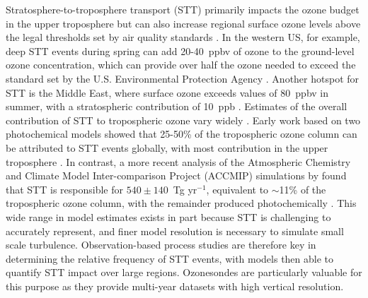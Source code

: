   Stratosphere-to-troposphere transport (STT) primarily impacts the ozone budget in the upper troposphere but can also increase regional surface ozone levels above the legal thresholds set by air quality standards \parencite{Danielson1968, Lelieveld2009, Lefohn2011, Langford2012, Zhang2014, Lin2015}.
  In the western US, for example, deep STT events during spring can add 20-40~ppbv of ozone to the ground-level ozone concentration, which can provide over half the ozone needed to exceed the standard set by the U.S. Environmental Protection Agency \parencite{Lin2012, Lin2015}.
  Another hotspot for STT is the Middle East, where surface ozone exceeds values of 80~ppbv in summer, with a stratospheric contribution of 10~ppb \parencite{Lelieveld2009}.
  Estimates of the overall contribution of STT to tropospheric ozone vary widely \parencite[e.g.][]{Galani2003, Stohl2003, Stevenson2006, Lefohn2011}.
  Early work based on two photochemical models showed that 25-50\% of the tropospheric ozone column can be attributed to STT events globally, with most contribution in the upper troposphere \parencite{Stohl2003}.
  In contrast, a more recent analysis of the Atmospheric Chemistry and Climate Model Inter-comparison Project (ACCMIP) simulations by \textcite{Young2013} found that STT is responsible for $540\pm140$~Tg yr$^{-1}$, equivalent to $\sim$11\% of the tropospheric ozone column, with the remainder produced photochemically \parencite{Monks2015}.
  This wide range in model estimates exists in part because STT is challenging to accurately represent, and finer model resolution is necessary to simulate small scale turbulence.
  Observation-based process studies are therefore key in determining the relative frequency of STT events, with models then able to quantify STT impact over large regions.
  Ozonesondes are particularly valuable for this purpose as they provide multi-year datasets with high vertical resolution.
  
